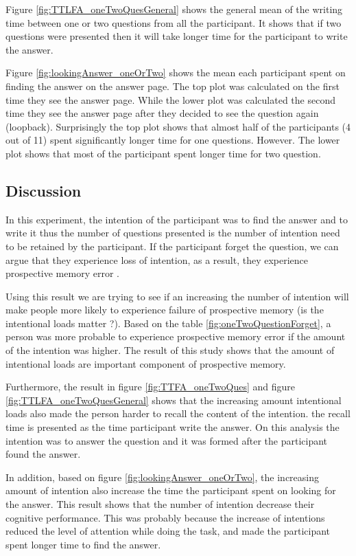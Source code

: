 Figure \ref{fig:TTLFA_oneTwoQuesGeneral} shows the general mean of the writing time between one or two questions from all the participant.
It shows that if two questions were presented then it will take longer time for the participant to write the answer.

Figure \ref{fig:lookingAnswer_oneOrTwo} shows the mean each participant spent on finding the answer on the answer page.
 The top plot was calculated on the first time they see the answer page.
 While the lower plot was calculated the second time they see the answer page after they decided to see the question again (loopback).
Surprisingly the top plot shows that almost half of the participants (4 out of 11) spent significantly longer time for one questions.
However. The lower plot shows that most of the participant spent longer time for two question.

\subsection{Discussion}

In this experiment, the intention of the participant was to find the answer and to write it
thus the number of questions presented is the number of intention need to be retained by the participant.
If the participant forget the question, we can argue that they experience loss of intention, as a result, they experience
prospective memory error \citep{Reason1984}.

Using this result we are trying to see  if an increasing the number of intention will make people more likely to experience failure of prospective memory
(is the intentional loads matter ?).
Based on the table \ref{fig:oneTwoQuestionForget}, a person was more probable to experience prospective memory error if the amount of the intention was higher.
The result of this study shows that the amount of intentional loads are important component of prospective memory.

Furthermore, the result in figure \ref{fig:TTFA_oneTwoQues} and figure \ref{fig:TTLFA_oneTwoQuesGeneral} shows that the increasing amount intentional loads also
made the person harder to recall the content of the intention. the recall time is presented as the time participant write the answer.
On this analysis the intention was to answer the question and it was formed after the participant found the answer.

In addition, based on figure \ref{fig:lookingAnswer_oneOrTwo}, the increasing amount of intention also increase the time
the participant spent on looking for the answer. This result shows that the number of intention decrease their cognitive performance.
This was probably because the increase of intentions reduced the level of attention while doing the task, and made
the participant spent longer time to find the answer.

